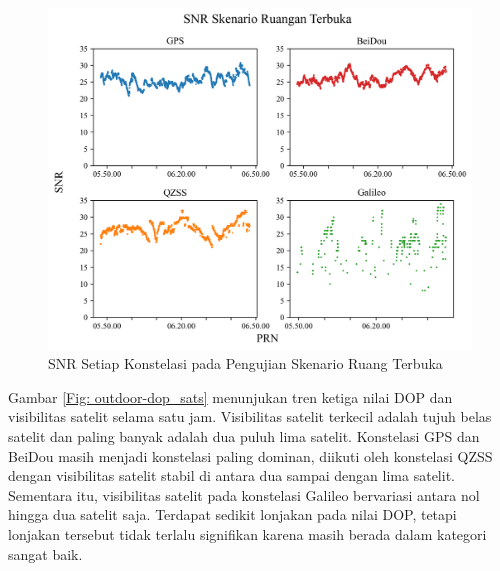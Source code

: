 \begin{figure}[H]
	\centering
	\includegraphics[width=13cm]{contents/chapter-4/4-skenario-outdoor/snr.png}
	\caption{SNR Setiap Konstelasi pada Pengujian Skenario Ruang Terbuka}
	\label{Fig: outdoor-snr}
\end{figure}

Gambar \ref{Fig: outdoor-dop_sats} menunjukan tren ketiga nilai DOP dan visibilitas satelit selama satu jam. Visibilitas satelit terkecil adalah tujuh belas satelit dan paling banyak adalah dua puluh lima satelit. Konstelasi GPS dan BeiDou masih menjadi konstelasi paling dominan, diikuti oleh konstelasi QZSS dengan visibilitas satelit stabil di antara dua sampai dengan lima satelit. Sementara itu, visibilitas satelit pada konstelasi Galileo bervariasi antara nol hingga dua satelit saja. Terdapat sedikit lonjakan pada nilai DOP, tetapi lonjakan tersebut tidak terlalu signifikan karena masih berada dalam kategori sangat baik.

